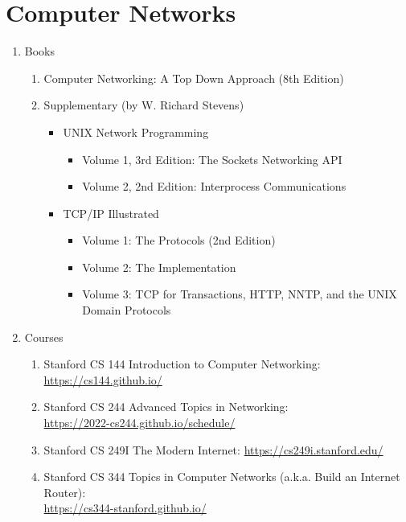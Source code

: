 \documentclass{article}
\begin{document}
\section{Computer Networks}
\begin{enumerate}
    \item Books
    \begin{enumerate}
        \item Computer Networking: A Top Down Approach (8th Edition) \cite{kurosecomputer}
        \item Supplementary (by W. Richard Stevens)
        \begin{itemize}
            \item UNIX Network Programming
            \begin{itemize}
                \item Volume 1, 3rd Edition: The Sockets Networking API \cite{stevens2018unixvolume1}
                \item Volume 2, 2nd Edition: Interprocess Communications \cite{richard1999unixvolume2}
            \end{itemize}
            \item TCP/IP Illustrated
            \begin{itemize}
                \item Volume 1: The Protocols (2nd Edition) \cite{fall2011tcp}
                \item Volume 2: The Implementation \cite{stevens1996tcp}
                \item Volume 3: TCP for Transactions, HTTP, NNTP, and the UNIX Domain Protocols \cite{stevens2000tcp}
            \end{itemize}
        \end{itemize}        
    \end{enumerate}
    
    \item Courses
    \begin{enumerate}
        \item Stanford CS 144 Introduction to Computer Networking:
        \href{https://cs144.github.io/}{https://cs144.github.io/}
        \item Stanford CS 244 Advanced Topics in Networking:\\
        \href{https://2022-cs244.github.io/schedule/}{https://2022-cs244.github.io/schedule/}
        \item Stanford CS 249I The Modern Internet:
        \href{https://cs249i.stanford.edu/}{https://cs249i.stanford.edu/}
        \item Stanford CS 344 Topics in Computer Networks (a.k.a. Build an Internet Router):\\
        \href{https://cs344-stanford.github.io/}{https://cs344-stanford.github.io/}
    \end{enumerate}


\end{enumerate}
\end{document}
